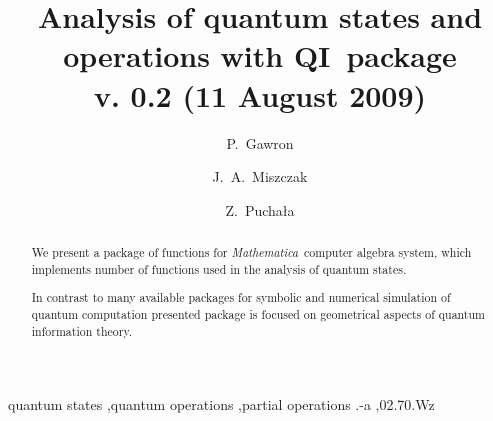 \documentclass[final,5p,times,twocolumn]{elsarticle}
\newcommand{\Mathematica}{\emph{Mathematica}}
\newcommand{\1}{{\rm 1\hspace{-0.9mm}l}}
\newcommand{\qi}{QI}
\begin{document}
\begin{frontmatter}



\title{Analysis of quantum states and operations with \qi\ package\\[6pt] \small{v. 0.2 (11 August 2009)}}


\author{P.~Gawron}
\author{J.~A.~Miszczak}
\author{Z.~Pucha{\l}a}
\address{Institute of Theoretical and Applied Informatics, Polish Academy of 
Sciences, Ba{\l}tycka 5, 44-100 Gliwice, Poland}

\begin{abstract}
We present a package of functions for \Mathematica\ computer algebra system, 
which implements number of functions used in the analysis of quantum states.

In contrast to many available packages for symbolic and numerical simulation of
quantum computation presented package is focused on geometrical aspects of 
quantum information theory.

\end{abstract}

\begin{keyword}
quantum states \sep quantum operations \sep partial operations
.-a \sep 02.70.Wz


\end{keyword}

\end{frontmatter}
\end{document}
